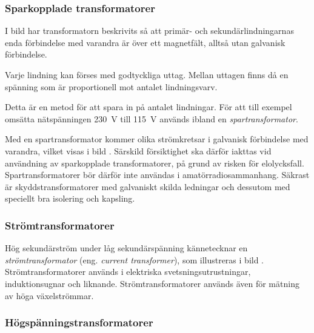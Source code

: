 \subsubsection{Sparkopplade transformatorer}


I bild  har transformatorn beskrivits så att primär- och
sekundärlindningarnas enda förbindelse med varandra är över ett magnetfält,
alltså utan galvanisk förbindelse.

Varje lindning kan förses med godtyckliga uttag. Mellan uttagen finns 
då en spänning som är proportionell mot antalet lindningsvarv.

Detta är en metod för att spara in på antalet lindningar.
För att till exempel omsätta nätspänningen \qty{230}{\volt} till \qty{115}{\volt}
används ibland en \emph{spartransformator}.

Med en spartransformator kommer olika strömkretsar i galvanisk förbindelse med
varandra, vilket visas i bild . Särskild försiktighet ska därför 
iakttas vid användning av sparkopplade transformatorer, på grund av risken för 
elolycksfall. Spartransformatorer bör därför inte användas i amatörradiosammanhang.
Säkrast är skyddstransformatorer med galvaniskt skilda ledningar och dessutom 
med speciellt bra isolering och kapsling.

\subsubsection{Strömtransformatorer}

Hög sekundärström under låg sekundärspänning kännetecknar en
\emph{strömtransformator} (eng. \emph{current transformer}),
som illustreras i bild .
Strömtransformatorer används i elektriska svetsningsutrustningar,
induktionsugnar och liknande. Strömtransformatorer används även för mätning 
av höga växelströmmar.


\subsubsection{Högspänningstransformatorer}

